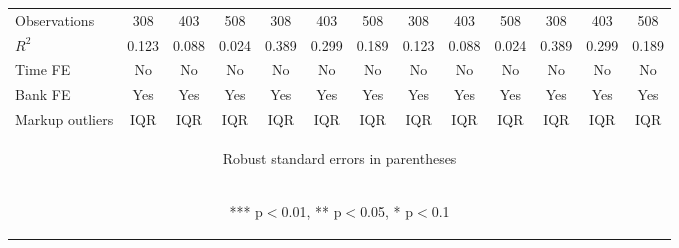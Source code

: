\documentclass[]{article}
\begin{document}
\begin{center}
\begin{tabular}{lcccccccccccc}
Observations & 308 & 403 & 508 & 308 & 403 & 508 & 308 & 403 & 508 & 308 & 403 & 508 \\
$R^2$ & 0.123 & 0.088 & 0.024 & 0.389 & 0.299 & 0.189 & 0.123 & 0.088 & 0.024 & 0.389 & 0.299 & 0.189 \\
Time FE & No & No & No & No & No & No & No & No & No & No & No & No \\
Bank FE & Yes & Yes & Yes & Yes & Yes & Yes & Yes & Yes & Yes & Yes & Yes & Yes \\
 Markup outliers & IQR & IQR & IQR & IQR & IQR & IQR & IQR & IQR & IQR & IQR & IQR & IQR \\ \hline
\multicolumn{13}{c}{\begin{footnotesize} Robust standard errors in parentheses\end{footnotesize}} \\
\multicolumn{13}{c}{\begin{footnotesize} *** p$<$0.01, ** p$<$0.05, * p$<$0.1\end{footnotesize}} \\
\end{tabular}
\end{center}
\end{document}
